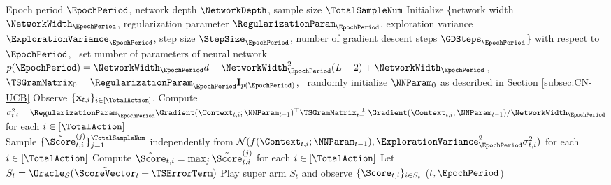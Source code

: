 \documentclass{article}
\theoremstyle{plain}
\begin{document}
\begin{algorithm*}[ht]
  \caption{$\CNTSD$}
  \label{alg:CN-TS-D}
\begin{algorithmic}
   Epoch period $\EpochPeriod$,
  network depth $\NetworkDepth$,
  sample size $\TotalSampleNum$
   Initialize \{network width $\NetworkWidth_{\EpochPeriod}$,
  regularization parameter $\RegularizationParam_{\EpochPeriod}$,
  exploration variance $\ExplorationVariance_{\EpochPeriod}$, 
  step size $\StepSize_{\EpochPeriod}$, 
  number of gradient descent steps $\GDSteps_{\EpochPeriod}$\} with respect to $\EpochPeriod$, \,
  set number of parameters of neural network $p(\EpochPeriod) = \NetworkWidth_{\EpochPeriod} d + \NetworkWidth_{\EpochPeriod}^{2} (L-2) + \NetworkWidth_{\EpochPeriod}$, \,
  $\TSGramMatrix_{0} = \RegularizationParam_{\EpochPeriod} \mathbf{I}_{p(\EpochPeriod)}$, \,
  randomly initialize $\NNParam_{0}$  as described in Section \ref{subsec:CN-UCB} 
  \STATE Observe $\{ \mathbf{x}_{t,i} \}_{i \in [\TotalAction]}$.
  \STATE Compute $\sigma_{t, i}^2 = \RegularizationParam_{\EpochPeriod} \Gradient(\Context_{t,i}; \NNParam_{t-1})^\top \TSGramMatrix_{t-1}^{-1} \Gradient(\Context_{t,i}; \NNParam_{t-1}) 
  / \NetworkWidth_\EpochPeriod$ for each $i \in [\TotalAction]$
  \\
  \STATE Sample $\{ \tilde{\Score}_{t,i}^{(j)} \}_{j=1}^{\TotalSampleNum}$ independently from $\mathcal{N}( f(\Context_{t,i}; \NNParam_{t-1}), \ExplorationVariance_{\EpochPeriod}^{2} \sigma_{t,i}^2)$ for each $i \in [\TotalAction]$
  \STATE Compute $\tilde{\Score}_{t, i} = \max_{j} \tilde{\Score}_{t,i}^{(j)}$ for each $i \in [\TotalAction]$
  \STATE Let $S_t = \Oracle_{\mathcal{S}} (\tilde{\ScoreVector}_t + \boldsymbol{\TSErrorTerm})$ 
  \STATE Play super arm $S_t$ and observe $\{ \Score_{t, i} \}_{i \in S_t}$
  \STATE \Update($t, \EpochPeriod$)
  \ENDWHILE
\end{algorithmic}
\end{algorithm*}
\end{document}
